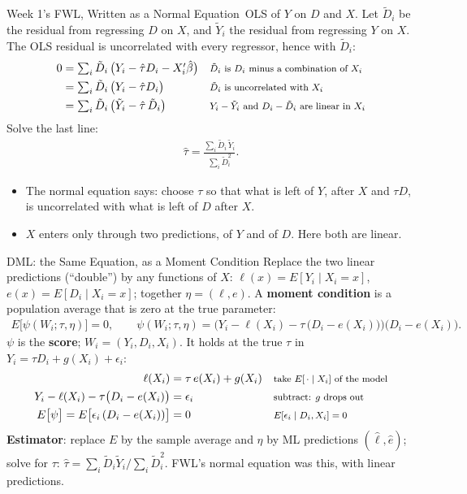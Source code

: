 \documentclass[aspectratio=169,11pt,xcolor=dvipsnames]{beamer}
\newcommand{\E}{E}
\newcommand{\core}{\,\raisebox{0.6pt}{\textcolor{corestar}{$\bigstar$}}}
\begin{document}
\begin{frame}{Week 1's FWL, Written as a Normal Equation\core}
OLS of $Y$ on $D$ and $X$. Let $\tilde D_i$ be the residual from regressing $D$ on $X$, and $\tilde Y_i$ the residual
from regressing $Y$ on $X$. The OLS residual is uncorrelated with every regressor, hence with $\tilde D_i$:
\begin{align*}
  0 &= \textstyle\sum_i \tilde D_i\,\big(Y_i - \hat\tau D_i - X_i'\hat\beta\big)
   && \text{\footnotesize $\tilde D_i$ is $D_i$ minus a combination of $X_i$} \\
  &= \textstyle\sum_i \tilde D_i\,\big(Y_i - \hat\tau D_i\big)
   && \text{\footnotesize $\tilde D_i$ is uncorrelated with $X_i$} \\
  &= \textstyle\sum_i \tilde D_i\,\big(\tilde Y_i - \hat\tau\,\tilde D_i\big)
   && \text{\footnotesize $Y_i - \tilde Y_i$ and $D_i - \tilde D_i$ are linear in $X_i$}
\end{align*}
Solve the last line:
\begin{align*}
  \hat\tau = \frac{\sum_i \tilde D_i\,\tilde Y_i}{\sum_i \tilde D_i^2} .
\end{align*}
\vskip-2pt
\begin{itemize}\itemsep3pt
  \item The normal equation says: choose $\tau$ so that what is left of $Y$, after $X$ and $\tau D$, is uncorrelated
        with what is left of $D$ after $X$.
  \item $X$ enters only through two predictions, of $Y$ and of $D$. Here both are linear.
\end{itemize}
\end{frame}

\begin{frame}{DML: the Same Equation, as a Moment Condition}
Replace the two linear predictions (``double'') by any functions of $X$: $\ell(x) = \E[Y_i\mid X_i = x]$,
$e(x) = \E[D_i\mid X_i = x]$; together $\eta = (\ell, e)$. A \textbf{moment condition} is a population average
that is zero at the true parameter:
\begin{align*}
  \E\big[\psi(W_i; \tau, \eta)\big] = 0, \qquad
  \psi(W_i; \tau, \eta) = \Big(Y_i - \ell(X_i) - \tau\,\big(D_i - e(X_i)\big)\Big)\big(D_i - e(X_i)\big) .
\end{align*}
$\psi$ is the \textbf{score}; $W_i = (Y_i, D_i, X_i)$. It holds at the true $\tau$ in $Y_i = \tau D_i + g(X_i) + \epsilon_i$:
\begin{align*}
  \ell(X_i) &= \tau\,e(X_i) + g(X_i)
   && \text{\footnotesize take $\E[\,\cdot\mid X_i]$ of the model} \\
  Y_i - \ell(X_i) - \tau\big(D_i - e(X_i)\big) &= \epsilon_i
   && \text{\footnotesize subtract: $g$ drops out} \\
  \E\big[\psi\big] = \E\big[\epsilon_i\,(D_i - e(X_i))\big] &= 0
   && \text{\footnotesize $\E[\epsilon_i\mid D_i, X_i] = 0$}
\end{align*}
\vskip-4pt
\textbf{Estimator}: replace $\E$ by the sample average and $\eta$ by ML predictions $(\hat\ell, \hat e)$; solve for $\tau$:
$\hat\tau = \sum_i\tilde D_i\tilde Y_i / \sum_i\tilde D_i^2$. FWL's normal equation was this, with linear predictions.
\end{frame}
\end{document}
